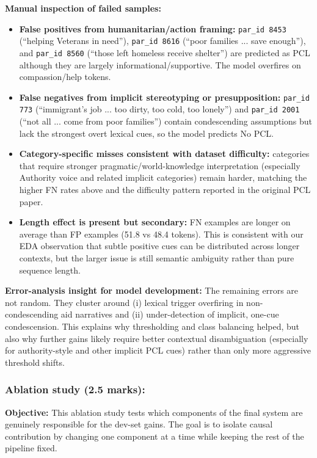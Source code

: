 \documentclass[11pt, a4paper]{article}
\begin{document}
\textbf{Manual inspection of failed samples:}
\begin{itemize}
  \item \textbf{False positives from humanitarian/action framing:} \texttt{par\_id 8453} (``helping Veterans in need''), \texttt{par\_id 8616} (``poor families ... save enough''), and \texttt{par\_id 8560} (``those left homeless receive shelter'') are predicted as PCL although they are largely informational/supportive. The model overfires on compassion/help tokens.
  \item \textbf{False negatives from implicit stereotyping or presupposition:} \texttt{par\_id 773} (``immigrant's job ... too dirty, too cold, too lonely'') and \texttt{par\_id 2001} (``not all ... come from poor families'') contain condescending assumptions but lack the strongest overt lexical cues, so the model predicts No PCL.
  \item \textbf{Category-specific misses consistent with dataset difficulty:} categories that require stronger pragmatic/world-knowledge interpretation (especially Authority voice and related implicit categories) remain harder, matching the higher FN rates above and the difficulty pattern reported in the original PCL paper.
  \item \textbf{Length effect is present but secondary:} FN examples are longer on average than FP examples (51.8 vs 48.4 tokens). This is consistent with our EDA observation that subtle positive cues can be distributed across longer contexts, but the larger issue is still semantic ambiguity rather than pure sequence length.
\end{itemize}

\textbf{Error-analysis insight for model development:}
The remaining errors are not random. They cluster around (i) lexical trigger overfiring in non-condescending aid narratives and (ii) under-detection of implicit, one-cue condescension. This explains why thresholding and class balancing helped, but also why further gains likely require better contextual disambiguation (especially for authority-style and other implicit PCL cues) rather than only more aggressive threshold shifts.

\subsubsection{Ablation study (2.5 marks):}

\textbf{Objective:}
This ablation study tests which components of the final system are genuinely responsible for the dev-set gains. The goal is to isolate causal contribution by changing one component at a time while keeping the rest of the pipeline fixed.
\end{document}
